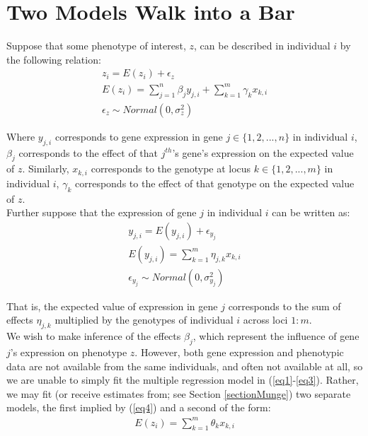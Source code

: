 \documentclass[12pt]{article}
\begin{document}
\section{Two Models Walk into a Bar}\label{sectionTwoModels}
Suppose that some phenotype of interest, $z$, can be described in individual $i$ by the following relation:
\begin{align}
z_i = E(z_i) + \epsilon_{z} \label{eq1}\\
E(z_i) = \sum_{j=1}^{n}\beta_jy_{j,i} + \sum_{k=1}^{m}\gamma_{k}x_{k,i} \label{eq2}\\
\epsilon_{z} \sim Normal(0,\sigma_{z}^2) \label{eq3}
\end{align} 

Where $y_{j,i}$ corresponds to gene expression in gene $j \in \{1, 2, ..., n\}$ in individual $i$, $\beta_j$ corresponds to the effect of that $j^{th}$'s gene's expression on the expected value of $z$. Similarly, $x_{k,i}$ corresponds to the genotype at locus $k \in \{1, 2, ..., m\}$ in individual $i$, $\gamma_k$ corresponds to the effect of that genotype on the expected value of $z$.\\

Further suppose that the expression of gene $j$ in individual $i$ can be written as:
\begin{align}
y_{j,i} = E(y_{j,i}) + \epsilon_{y_j} \label{eq4}\\
E(y_{j,i}) = \sum_{k=1}^{m}\eta_{j,k}x_{k,i} \label{eq5}\\
 \epsilon_{y_j} \sim Normal(0,\sigma_{y_j}^2) \label{eq6}
\end{align} 

That is, the expected value of expression in gene $j$ corresponds to the sum of effects $\eta_{j,k}$ multiplied by the genotypes of individual $i$ across loci $1:m$.\\

We wish to make inference of the effects $\beta_j$, which represent the influence of gene $j$'s expression on phenotype $z$. However, both gene expression and phenotypic data are not available from the same individuals, and often not available at all, so we are unable to simply fit the multiple regression model in (\ref{eq1}-\ref{eq3}). Rather, we may fit (or receive estimates from; see Section \ref{sectionMunge}) two separate models, the first implied by (\ref{eq4}) and a second of the form:
\begin{align}
E(z_i) = \sum_{k=1}^{m}\theta_{k}x_{k,i} \label{eq7}
\end{align} 
\end{document}
